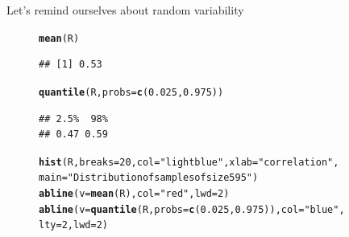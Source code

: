 \documentclass[10pt]{beamer}\usepackage[]{graphicx}\usepackage[]{color}
\makeatletter
\newcommand{\hlnum}[1]{\textcolor[rgb]{0.686,0.059,0.569}{#1}}%
\newcommand{\hlstr}[1]{\textcolor[rgb]{0.192,0.494,0.8}{#1}}%
\newcommand{\hlstd}[1]{\textcolor[rgb]{0.345,0.345,0.345}{#1}}%
\newcommand{\hlkwc}[1]{\textcolor[rgb]{0.333,0.667,0.333}{#1}}%
\newcommand{\hlkwd}[1]{\textcolor[rgb]{0.737,0.353,0.396}{\textbf{#1}}}%
\newenvironment{kframe}{%
 \def\at@end@of@kframe{}%
 \ifinner\ifhmode%
  \def\at@end@of@kframe{\end{minipage}}%
  \begin{minipage}{\columnwidth}%
 \fi\fi%
 \def\FrameCommand##1{\hskip\@totalleftmargin \hskip-\fboxsep
 \colorbox{shadecolor}{##1}\hskip-\fboxsep
     \hskip-\linewidth \hskip-\@totalleftmargin \hskip\columnwidth}%
 \MakeFramed {\advance\hsize-\width
   \@totalleftmargin\z@ \linewidth\hsize
   \@setminipage}}%
 {\par\unskip\endMakeFramed%
 \at@end@of@kframe}
\newenvironment{knitrout}{}{} %
\makeatother
\begin{document}
\begin{frame}[fragile]{Let's remind ourselves about random variability}
\begin{figure}
	\begin{minipage}[h]{0.30\linewidth}
\begin{knitrout}\tiny
{}\color{fgcolor}\begin{kframe}
\begin{alltt}
\hlkwd{mean}\hlstd{(R)}
\end{alltt}
\begin{verbatim}
## [1] 0.53
\end{verbatim}
\begin{alltt}
\hlkwd{quantile}\hlstd{(R,} \hlkwc{probs} \hlstd{=} \hlkwd{c}\hlstd{(}\hlnum{0.025}\hlstd{,} \hlnum{0.975}\hlstd{))}
\end{alltt}
\begin{verbatim}
## 2.5%  98% 
## 0.47 0.59
\end{verbatim}
\end{kframe}
\end{knitrout}
	\end{minipage}
	\hspace{0.4cm}
	\begin{minipage}[h]{0.59\linewidth}
\begin{knitrout}\tiny
{}\color{fgcolor}\begin{kframe}
\begin{alltt}
\hlkwd{hist}\hlstd{(R,} \hlkwc{breaks} \hlstd{=} \hlnum{20}\hlstd{,} \hlkwc{col} \hlstd{=} \hlstr{"lightblue"}\hlstd{,} \hlkwc{xlab} \hlstd{=} \hlstr{"correlation"}\hlstd{,}
     \hlkwc{main} \hlstd{=} \hlstr{"Distribution of samples of size 595"}\hlstd{)}
\hlkwd{abline}\hlstd{(}\hlkwc{v} \hlstd{=} \hlkwd{mean}\hlstd{(R),} \hlkwc{col} \hlstd{=} \hlstr{"red"}\hlstd{,} \hlkwc{lwd} \hlstd{=} \hlnum{2}\hlstd{)}
\hlkwd{abline}\hlstd{(}\hlkwc{v} \hlstd{=} \hlkwd{quantile}\hlstd{(R,} \hlkwc{probs} \hlstd{=} \hlkwd{c}\hlstd{(}\hlnum{0.025}\hlstd{,} \hlnum{0.975}\hlstd{)),} \hlkwc{col} \hlstd{=} \hlstr{"blue"}\hlstd{,}
       \hlkwc{lty} \hlstd{=} \hlnum{2}\hlstd{,} \hlkwc{lwd} \hlstd{=} \hlnum{2}\hlstd{)}
\end{alltt}
\end{kframe}


\end{knitrout}
\end{minipage}
\end{figure}
\end{frame}
\end{document}
